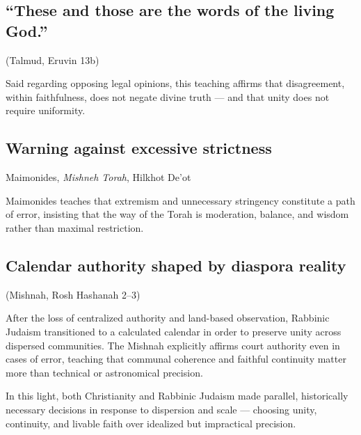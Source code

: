 \documentclass[10pt,twoside,openany]{book}
\begin{document}
\subsection{``These and those are the words of the living God.''}
{\small (Talmud, Eruvin 13b)}

Said regarding opposing legal opinions, this teaching affirms that
disagreement, within faithfulness, does not negate divine truth --- and
that unity does not require uniformity.

\subsection{Warning against excessive strictness}
{\small Maimonides, \emph{Mishneh Torah}, Hilkhot De'ot}

Maimonides teaches that extremism and unnecessary stringency constitute
a path of error, insisting that the way of the Torah is moderation,
balance, and wisdom rather than maximal restriction.

\subsection{Calendar authority shaped by diaspora reality}
{\small (Mishnah, Rosh Hashanah 2--3)}

After the loss of centralized authority and land-based observation,
Rabbinic Judaism transitioned to a calculated calendar in order to
preserve unity across dispersed communities. The Mishnah explicitly
affirms court authority even in cases of error, teaching that communal
coherence and faithful continuity matter more than technical or
astronomical precision.

\bigskip

In this light, both Christianity and Rabbinic Judaism made parallel,
historically necessary decisions in response to dispersion and
scale --- choosing unity, continuity, and livable faith over idealized
but impractical precision.
\end{document}
